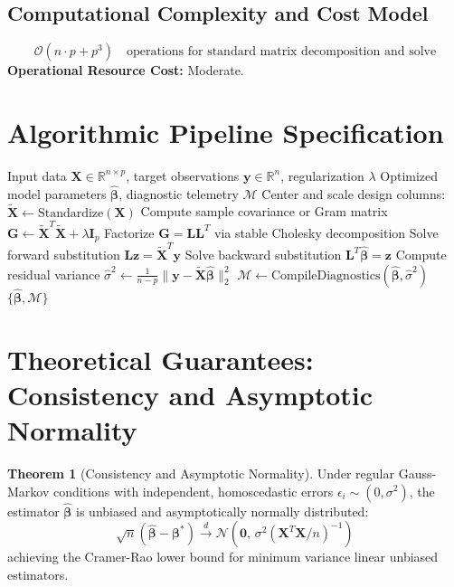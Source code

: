 \documentclass[11pt,a4paper]{article}
\theoremstyle{definition}
\newtheorem{theorem}{\textbf{Theorem}}[section]
\begin{document}
\subsection{Computational Complexity and Cost Model}
\begin{equation}
\mathcal{O}(n \cdot p + p^3) \quad \text{operations for standard matrix decomposition and solve}
\end{equation}
\textbf{Operational Resource Cost:} Moderate.

\section{Algorithmic Pipeline Specification}

\begin{algorithm}[H]
\caption{Generalized additive models Execution}
\begin{algorithmic}[1]
\Require Input data $\mathbf{X} \in \mathbb{R}^{n \times p}$, target observations $\mathbf{y} \in \mathbb{R}^n$, regularization $\lambda$
\Ensure Optimized model parameters $\hat{\boldsymbol{\beta}}$, diagnostic telemetry $\mathcal{M}$
\State Center and scale design columns: $\tilde{\mathbf{X}} \gets \text{Standardize}(\mathbf{X})$
\State Compute sample covariance or Gram matrix $\mathbf{G} \gets \tilde{\mathbf{X}}^T \tilde{\mathbf{X}} + \lambda \mathbf{I}_p$
\State Factorize $\mathbf{G} = \mathbf{L} \mathbf{L}^T$ via stable Cholesky decomposition
\State Solve forward substitution $\mathbf{L} \mathbf{z} = \tilde{\mathbf{X}}^T \mathbf{y}$
\State Solve backward substitution $\mathbf{L}^T \hat{\boldsymbol{\beta}} = \mathbf{z}$
\State Compute residual variance $\hat{\sigma}^2 \gets \frac{1}{n - p} \| \mathbf{y} - \tilde{\mathbf{X}} \hat{\boldsymbol{\beta}} \|_2^2$
\State $\mathcal{M} \gets \text{CompileDiagnostics}(\hat{\boldsymbol{\beta}}, \hat{\sigma}^2)$
\State \Return $\{\hat{\boldsymbol{\beta}}, \mathcal{M}\}$
\end{algorithmic}
\end{algorithm}

\section{Theoretical Guarantees: Consistency and Asymptotic Normality}

\begin{theorem}[Consistency and Asymptotic Normality]
Under regular Gauss-Markov conditions with independent, homoscedastic errors $\epsilon_i \sim (0, \sigma^2)$, the estimator $\hat{\boldsymbol{\beta}}$ is unbiased and asymptotically normally distributed:
\begin{equation}
\sqrt{n}(\hat{\boldsymbol{\beta}} - \boldsymbol{\beta}^*) \xrightarrow{d} \mathcal{N}\left(\mathbf{0}, \, \sigma^2 (\mathbf{X}^T \mathbf{X} / n)^{-1}\right)
\end{equation}
achieving the Cramer-Rao lower bound for minimum variance linear unbiased estimators.
\end{theorem}
\end{document}
